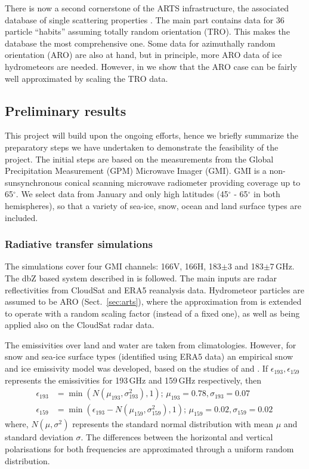 \documentclass[12pt,oneside,a4paper]{article}
\begin{document}
There is now a second cornerstone of the ARTS infrastructure, the associated
database of single scattering properties \citep{eriksson:agene:18}. The main
part contains data for 36 particle ``habits'' assuming totally random
orientation (TRO). This makes the database the most comprehensive one. Some
data for azimuthally random orientation (ARO) are also at hand, but in 
principle, more ARO data of ice hydrometeors are needed. However, in \citet{barlakas:intro:21} we show that the ARO case can be fairly well approximated by scaling the TRO data.

\subsection{Preliminary results}
%
This project will build upon the ongoing efforts, hence we briefly summarize
the preparatory steps we have undertaken to demonstrate the feasibility of the
project. The initial steps are based on the measurements from the Global
Precipitation Measurement (GPM) Microwave Imager (GMI). GMI is a
non-sunsynchronous conical scanning microwave radiometer providing coverage
up to 65$^{\circ}$. We select data from January and only high latitudes
(45$^{\circ}$ - 65$^{\circ}$ in both hemispheres), so that a variety of
sea-ice, snow, ocean and land surface types are included.

\subsubsection{Radiative transfer simulations}
%
\label{sec:radiative_transfer}
The simulations cover four GMI channels: 166V, 166H, 183$\pm$3
and 183$\pm$7\,GHz. The dbZ based
system described in \citet{ekelund:using:20} is followed. The
main inputs are radar reflectivities from CloudSat and ERA5 reanalysis data.
Hydrometeor particles are assumed to be ARO (Sect.~\ref{sec:arts}), where the
approximation from \citet{barlakas:intro:21} is extended to operate with 
a random scaling factor (instead of a fixed one), as well as being applied also
on the CloudSat radar data.

The emissivities over land and water are taken from climatologies. However, for
snow and sea-ice surface types (identified using ERA5 data) an empirical snow
and ice emissivity model was developed, based on the studies of
\citet{harlow:2009:milli} and \citet{hewison:2002:airbo}. If
$\epsilon_{193}, \epsilon_{159}$ represents the emissivities for 193\,GHz and
159\,GHz respectively, then
\begin{align}
\epsilon_{193}& = \min({N(\mu_{193}, \sigma_{193}^{2}), 1});\, \mu_{193} = 0.78, \sigma_{193} = 0.07 \label{eq:1}\\
\epsilon_{159}& = \min(\epsilon_{193} - N(\mu_{159}, \sigma_{159}^{2}), 1) ;\,  \mu_{159} = 0.02, \sigma_{159} = 0.02\,\label{eq:2}
\end{align}
where, $N(\mu, \sigma^{2})$ represents the standard normal distribution with
mean $\mu$ and standard deviation $\sigma$. The differences between the
horizontal and vertical polarisations for both frequencies are 
approximated through a uniform random distribution.
\end{document}
